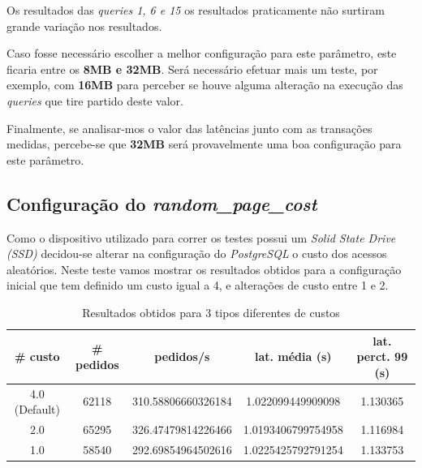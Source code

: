 Os resultados das \textit{queries 1, 6 e 15} os resultados praticamente não surtiram grande variação nos resultados.

Caso fosse necessário escolher a melhor configuração para este parâmetro, este ficaria entre os \textbf{8MB e 32MB}. Será necessário efetuar mais um teste, por exemplo, com \textbf{16MB} para perceber se houve alguma alteração na execução das \textit{queries} que tire partido deste valor.

Finalmente, se analisar-mos o valor das latências junto com as transações medidas, percebe-se que \textbf{32MB} será provavelmente uma boa configuração para este parâmetro.


\subsection{Configuração do \textit{random\_page\_cost}}

Como o dispositivo utilizado para correr os testes possui um \textit{Solid State Drive (SSD)} decidou-se alterar na configuração do \textit{PostgreSQL} o custo dos acessos aleatórios. Neste teste vamos mostrar os resultados obtidos para a configuração inicial que tem definido um custo igual a 4, e alterações de custo entre 1 e 2.

\begin{table}[!h]
\center
\small
\begin{tabular}{|c|c|c|c|c|}
\hline
\textbf{\# custo} & \textbf{\# pedidos} & \textbf{pedidos/s} & \textbf{lat. média (s)} & \textbf{lat. perct. 99 (s)}  \\ \hline
4.0 (Default) & 62118 & 310.58806660326184 & 1.022099449909098 & 1.130365  \\ \hline
2.0 & 65295 & 326.47479814226466 & 1.0193406799754958 & 1.116984  \\ \hline
1.0 & 58540 & 292.69854964502616 & 1.0225425792791254 & 1.133753  \\ \hline
\end{tabular}
\caption{Resultados obtidos para 3 tipos diferentes de custos}
\end{table}

